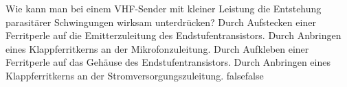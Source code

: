     {Wie kann man bei einem VHF-Sender mit kleiner Leistung die Entstehung parasitärer Schwingungen wirksam unterdrücken?}
    {Durch Aufstecken einer Ferritperle auf die Emitterzuleitung des Endstufentransistors.}
    {Durch Anbringen eines Klappferritkerns an der Mikrofonzuleitung.}
    {Durch Aufkleben einer Ferritperle auf das Gehäuse des Endstufentransistors.}
    {Durch Anbringen eines Klappferritkerns an der Stromversorgungszuleitung.}
    {false}{false}